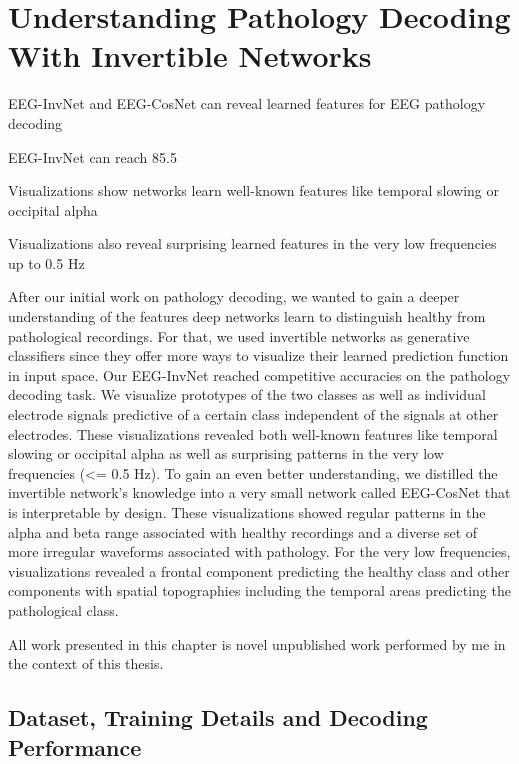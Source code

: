 \chapter{Understanding Pathology Decoding With
Invertible Networks}\label{understanding-pathology}

\begin{startbox}{EEG-InvNet and EEG-CosNet can reveal learned features for EEG pathology decoding}
\item EEG-InvNet can reach 85.5%
\item Visualizations show networks learn well-known features like temporal slowing or occipital alpha
\item Visualizations also reveal surprising learned features in the very low frequencies up to 0.5 Hz
\end{startbox}


    After our initial work on pathology decoding, we wanted to gain a deeper
understanding of the features deep networks learn to distinguish healthy
from pathological recordings. For that, we used invertible networks as
generative classifiers since they offer more ways to visualize their
learned prediction function in input space. Our EEG-InvNet reached
competitive accuracies on the pathology decoding task. We visualize
prototypes of the two classes as well as individual electrode signals
predictive of a certain class independent of the signals at other
electrodes. These visualizations revealed both well-known features like
temporal slowing or occipital alpha as well as surprising patterns in
the very low frequencies (\textless= 0.5 Hz). To gain an even better
understanding, we distilled the invertible network's knowledge into a
very small network called EEG-CosNet that is interpretable by design.
These visualizations showed regular patterns in the alpha and beta range
associated with healthy recordings and a diverse set of more irregular
waveforms associated with pathology. For the very low frequencies,
visualizations revealed a frontal component predicting the healthy class
and other components with spatial topographies including the temporal
areas predicting the pathological class.

All work presented in this chapter is novel unpublished work performed
by me in the context of this thesis.

\section{Dataset, Training Details and Decoding
Performance}\label{dataset-training-details-and-decoding-performance}

